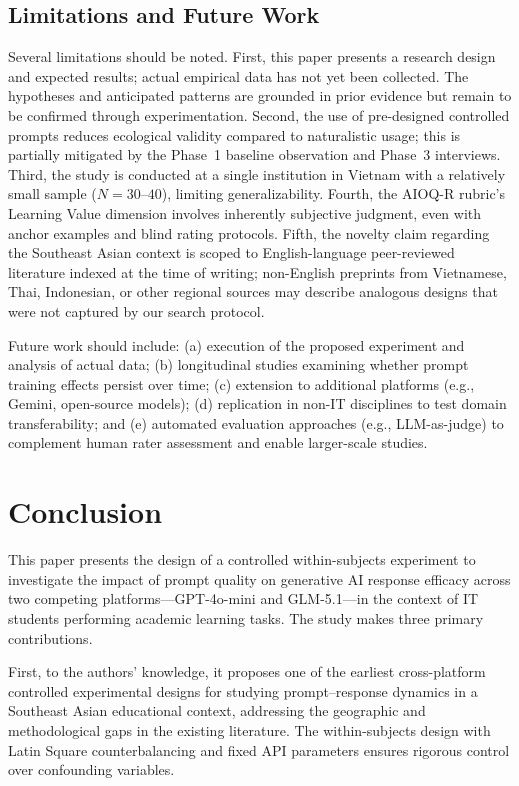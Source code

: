 \documentclass[runningheads]{llncs}
\begin{document}
\subsection{Limitations and Future Work}

Several limitations should be noted. First, this paper presents a research design and expected results; actual empirical data has not yet been collected. The hypotheses and anticipated patterns are grounded in prior evidence but remain to be confirmed through experimentation. Second, the use of pre-designed controlled prompts reduces ecological validity compared to naturalistic usage; this is partially mitigated by the Phase~1 baseline observation and Phase~3 interviews. Third, the study is conducted at a single institution in Vietnam with a relatively small sample ($N = 30$--$40$), limiting generalizability. Fourth, the AIOQ-R rubric's Learning Value dimension involves inherently subjective judgment, even with anchor examples and blind rating protocols. Fifth, the novelty claim regarding the Southeast Asian context is scoped to English-language peer-reviewed literature indexed at the time of writing; non-English preprints from Vietnamese, Thai, Indonesian, or other regional sources may describe analogous designs that were not captured by our search protocol.

Future work should include: (a) execution of the proposed experiment and analysis of actual data; (b) longitudinal studies examining whether prompt training effects persist over time; (c) extension to additional platforms (e.g., Gemini, open-source models); (d) replication in non-IT disciplines to test domain transferability; and (e) automated evaluation approaches (e.g., LLM-as-judge) to complement human rater assessment and enable larger-scale studies.

\section{Conclusion}\label{sec:conclusion}

This paper presents the design of a controlled within-subjects experiment to investigate the impact of prompt quality on generative AI response efficacy across two competing platforms---GPT-4o-mini and GLM-5.1---in the context of IT students performing academic learning tasks. The study makes three primary contributions.

First, to the authors' knowledge, it proposes one of the earliest cross-platform controlled experimental designs for studying prompt--response dynamics in a Southeast Asian educational context, addressing the geographic and methodological gaps in the existing literature. The within-subjects design with Latin Square counterbalancing and fixed API parameters ensures rigorous control over confounding variables.
\end{document}
